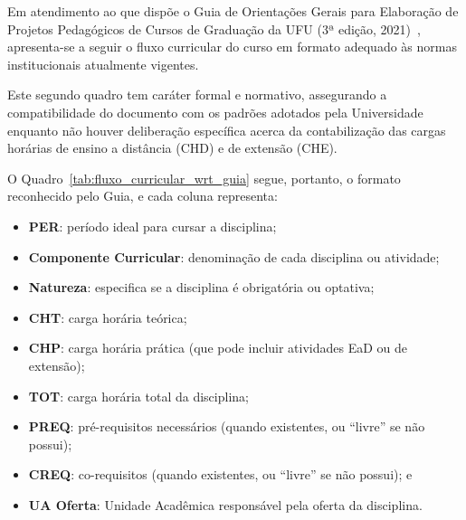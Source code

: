 
Em atendimento ao que dispõe o Guia de Orientações Gerais para Elaboração de Projetos Pedagógicos de Cursos de Graduação da UFU (3ª edição, 2021)~\cite{UFU:GuiaPPC:2021}, apresenta-se a seguir o fluxo curricular do curso em formato adequado às normas institucionais atualmente vigentes.

Este segundo quadro tem caráter formal e normativo, assegurando a compatibilidade do documento com os padrões adotados pela Universidade enquanto não houver deliberação específica acerca da contabilização das cargas horárias de ensino a distância (CHD) e de extensão (CHE).

O Quadro~\ref{tab:fluxo_curricular_wrt_guia} segue, portanto, o formato reconhecido pelo Guia, e cada coluna representa:

\begin{itemize}[itemsep=0pt]
    \item \textbf{PER}: período ideal para cursar a disciplina;
    \item \textbf{Componente Curricular}: denominação de cada disciplina ou atividade;
    \item \textbf{Natureza}: especifica se a disciplina é obrigatória ou optativa;
    \item \textbf{CHT}: carga horária teórica;
    \item \textbf{CHP}: carga horária prática (que pode incluir atividades EaD ou de extensão);
    \item \textbf{TOT}: carga horária total da disciplina;
    \item \textbf{PREQ}: pré-requisitos necessários (quando existentes, ou ``livre'' se não possui);
    \item \textbf{CREQ}: co-requisitos (quando existentes, ou ``livre'' se não possui); e
    \item \textbf{UA Oferta}: Unidade Acadêmica responsável pela oferta da disciplina.
\end{itemize}



\newpage

